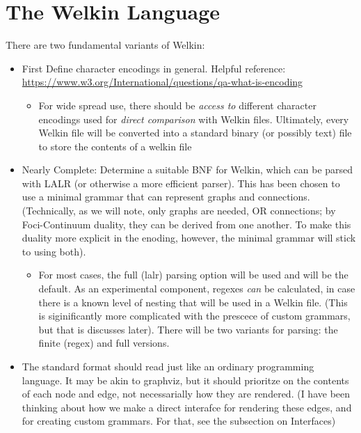 \section{The Welkin Language}

There are two fundamental variants of Welkin:
\begin{itemize}
<<<<<<< HEAD:chapters/3-spec.tex
	\item First Define character encodings in general. Helpful reference: \url{https://www.w3.org/International/questions/qa-what-is-encoding}
	      \begin{itemize}
		      \item For wide spread use, there should be \textit{access to} different character encodings used for \textit{direct comparison} with Welkin files. Ultimately, every Welkin file will be converted into a standard binary (or possibly text) file to store the contents of a welkin file
	      \end{itemize}
	\item Nearly Complete: Determine a suitable BNF for Welkin, which can be parsed with LALR (or otherwise a more efficient parser). This has been chosen to use a minimal grammar that can represent graphs and connections. (Technically, as we will note, only graphs are needed, OR connections; by Foci-Continuum duality, they can be derived from one another. To make this duality more explicit in the enoding, however, the minimal grammar will stick to using both).
	      \begin{itemize}
		      \item For most cases, the full (lalr) parsing option will be used and will be the default. As an experimental component, regexes \textit{can} be calculated, in case there is a known level of nesting that will be used in a Welkin file. (This is siginificantly more complicated with the prescece of custom grammars, but that is discusses later). There will be two variants for parsing: the finite (regex) and full versions.
		            \end{itemize}
		      \item The standard format should read just like an ordinary programming language. It may be akin to graphviz, but it should prioritze on the contents of each node and edge, not necessarially how they are rendered. (I have been thinking about how we make a direct interafce for rendering these edges, and for creating custom grammars. For that, see the subsection on Interfaces)
		            \begin{itemize}


\end{itemize}
\end{itemize}
